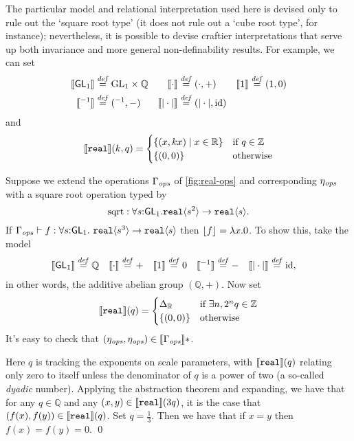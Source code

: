 The particular model and relational interpretation used here is devised only to
rule out the `square root type' (it does not rule out a `cube root type', for instance); 
nevertheless, it is possible to devise craftier interpretations that serve up both invariance
and more general non-definability results. For example, we can set
\begin{align*}
\semSort{\SynGL{1}} & \isDefinedAs \mathbb \mathbb \GL{1} \times \mathbb Q &
\semIndexExp{\cdot} & \isDefinedAs (\cdot,+) & 
\semIndexExp{1} & \isDefinedAs (1,0) \\
\semIndexExp{{}^{-1}} & \isDefinedAs \mathrm{({}^{-1},-)} &
\semIndexExp{|\cdot|} & \isDefinedAs \mathrm{(|\cdot|,\mathrm{id})}
\end{align*}
and
\[
\llbracket \textup{\texttt{real}} \rrbracket(k,q) = 
  {\begin{cases} \{(x,k x) \mathrel| x \in \mathbb R \} & \text{if }q \in \mathbb Z\\
                      \{(0,0)\} & \text{otherwise}
  \end{cases}}
\]

\begin{example}\label{ex:cube-root-nondef}
Suppose we extend the operations $\Gamma_{\mathit{ops}}$ of \autoref{fig:real-ops}
and corresponding $\eta_{\mathit{ops}}$ with a square root operation typed by
\[
\mathrm{sqrt} : \forall s\mathord: \mathsf{GL}_1.\textup{\texttt{real}}\langle s^2 \rangle \to \textup{\texttt{real}}\langle s \rangle.
\]
If  $\Gamma_{\mathit{ops}} \vdash f : \forall s \mathord: \mathsf{GL}_1.\
\textup{\texttt{real}}\langle s^3 \rangle \to \textup{\texttt{real}}\langle s \rangle$ 
then $\left\lfloor{f}\right\rfloor = \lambda x.0$.
To show this, take the model
\begin{align*}
\llbracket \mathsf{GL}_1 \rrbracket & \stackrel{\mathit{def}}= \mathbb Q &
\llbracket \cdot \rrbracket & \stackrel{\mathit{def}}= + & 
\llbracket 1 \rrbracket & \stackrel{\mathit{def}}= 0 &
\llbracket {}^{-1} \rrbracket & \stackrel{\mathit{def}}= \mathrm{-} &
\llbracket |\cdot| \rrbracket & \stackrel{\mathit{def}}= \mathrm{id},
\end{align*}
in other words, the additive abelian group $(\mathbb Q, +)$. 
Now set
\[
\llbracket \textup{\texttt{real}} \rrbracket(q) =
\begin{cases} \Delta_{\mathbb R} & \text{if }\exists n, 2^n q \in\mathbb Z\\
\{(0,0)\} & \text{otherwise}
\end{cases}
\]
It's easy to check that $(\eta_{\mathit{ops}},\eta_{\mathit{ops}})\in\llbracket \Gamma_{\mathit{ops}} \rrbracket*$.

Here $q$ is tracking the exponents on scale parameters, with
$\llbracket \textup{\texttt{real}} \rrbracket(q)$ relating only zero to itself
unless the denominator of $q$ is a power of two (a so-called
\emph{dyadic} number).  
Applying the abstraction theorem and expanding, we have that for
any
$q\in\mathbb Q$ and any
$(x,y)\in\llbracket \textup{\texttt{real}} \rrbracket(3q)$, it is the case that
$(f(x),f(y))\in\llbracket \textup{\texttt{real}} \rrbracket(q)$. Set $q = \frac 1 3$.  
Then we have that if $x=y$ then $f(x)=f(y)=0$.
\qed
\end{example}

